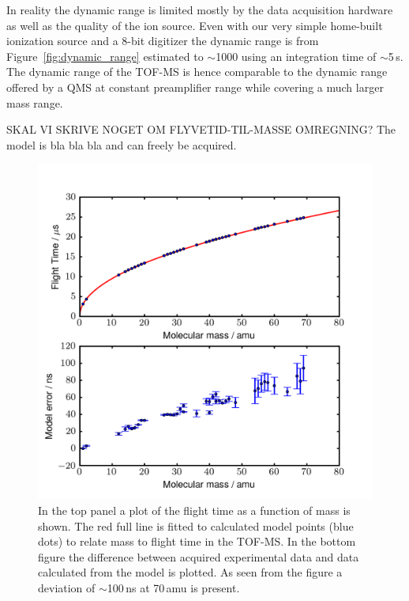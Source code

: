 \documentclass[aip,rsi]{revtex4-1}
\begin{document}
In reality the dynamic range is limited mostly by the data acquisition hardware as well as the quality of the ion source. Even with our very simple home-built ionization source and a 8-bit digitizer the dynamic range is from Figure~\ref{fig:dynamic_range} estimated to $\sim$1000 using an integration time of $\sim$5\,s. The dynamic range of the TOF-MS is hence comparable to the dynamic range offered by a QMS at constant preamplifier range while covering a much larger mass range.

SKAL VI SKRIVE NOGET OM FLYVETID-TIL-MASSE OMREGNING?
The model is bla bla bla and can freely be acquired\cite{ModelGithub}.
\begin{figure}
 \includegraphics[width=14cm]{model_error.png}%
 \caption{In the top panel a plot of the flight time as a function of mass is shown. The red full line is fitted to calculated model points (blue dots) to relate mass to flight time in the TOF-MS. In the bottom figure the difference between acquired experimental data and data calculated from the model is plotted. As seen from the figure a deviation of $\sim$100\,ns at 70\,amu is present.\label{fig:model_error}}%
\end{figure}
\end{document}
